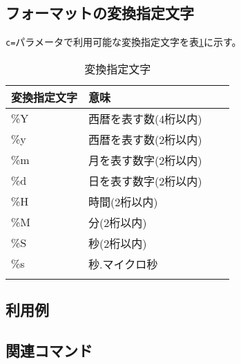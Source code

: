 \subsection*{フォーマットの変換指定文字}
\verb|c=|パラメータで利用可能な変換指定文字を表\ref{tbl:mdformat}に示す。

\begin{table}[htbp]
\begin{center}
\caption{変換指定文字\label{tbl:mdformat}}
{\small
\renewcommand{\arraystretch}{1.5}
\begin{tabular}{llll}
\hline
変換指定文字 & 意味 \\
\hline
\%Y           & 西暦を表す数(4桁以内) \\
\%y           & 西暦を表す数(2桁以内)  \\
\%m           & 月を表す数字(2桁以内)  \\
\%d           & 日を表す数字(2桁以内)  \\
\%H           & 時間(2桁以内) \\
\%M           & 分(2桁以内)   \\
\%S           & 秒(2桁以内) \\
\%s           & 秒.マイクロ秒 \\
\hline \\
\end{tabular}
}      
\end{center}
\end{table}


\subsection*{利用例}

\subsection*{関連コマンド}

%
